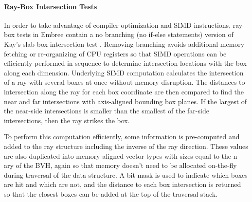 \paragraph{Ray-Box Intersection Tests}

In order to take advantage of compiler optimization and SIMD instructions,
ray-box tests in Embree contain a no branching (no if-else statements) version of
Kay's slab box intersection test \cite{Kay_1986}. Removing branching avoids
additional memory fetching or re-organizing of CPU registers so that SIMD
operations can be efficiently performed in sequence to determine intersection
locations with the box along each dimension. Underlying SIMD computation
calculates the intersection of a ray with several boxes at once without memory
disruption. The distances to intersection along the ray for each box coordinate
are then compared to find the near and far intersections with axis-aligned
bounding box planes. If the largest of the near-side intersections is smaller
than the smallest of the far-side intersections, then the ray strikes the box.

To perform this computation efficiently, some information is pre-computed and
added to the ray structure including the inverse of the ray direction. These
values are also duplicated into memory-aligned vector types with sizes equal to
the n-ary of the BVH, again so that memory doesn't need to be allocated
on-the-fly during traversal of the data structure. A bit-mask is used to
indicate which boxes are hit and which are not, and the distance to each box
intersection is returned so that the closest boxes can be added at the top of
the traversal stack.




